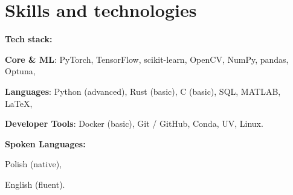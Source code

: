     \section{Skills and technologies}

    \begin{twocolentry}{}
        \textbf{Tech stack:}
        \begin{highlights}
            \item \textbf{Core \& ML}: \quad PyTorch, TensorFlow, scikit-learn, OpenCV, NumPy, pandas, Optuna,
            \item \textbf{Languages}: \quad Python (advanced), Rust (basic), C (basic), SQL, MATLAB, LaTeX,
            \item \textbf{Developer Tools}: \quad Docker (basic), Git / GitHub, Conda, UV, Linux.
        \end{highlights}
    \end{twocolentry}

    \begin{twocolentry}{}
        \textbf{Spoken Languages:}
        \begin{highlights}
            \item Polish (native),
            \item English (fluent).
        \end{highlights}
    \end{twocolentry}
